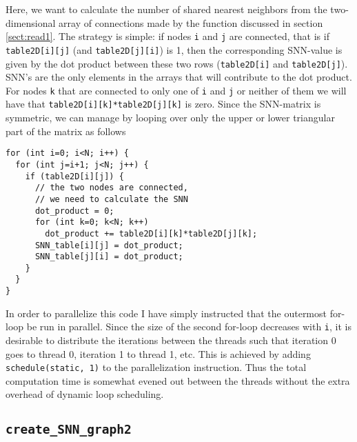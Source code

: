 \documentclass[reprint, english,notitlepage,nofootinbib]{revtex4-1}  %
\begin{document}
Here, we want to calculate the number of shared nearest neighbors from the two-dimensional array of connections made by the function discussed in section \ref{sect:read1}. The strategy is simple: if nodes \verb|i| and \verb|j| are connected, that is if \verb|table2D[i][j]| (and \verb|table2D[j][i]|) is 1, then the corresponding SNN-value is given by the dot product between these two rows (\verb|table2D[i]| and \verb|table2D[j]|). SNN's are the only elements in the arrays that will contribute to the dot product. For nodes \verb|k| that are connected to only one of \verb|i| and \verb|j| or neither of them we will have that \verb|table2D[i][k]*table2D[j][k]| is zero. Since the SNN-matrix is symmetric, we can manage by looping over only the upper or lower triangular part of the matrix as follows
\begin{verbatim}
for (int i=0; i<N; i++) {
  for (int j=i+1; j<N; j++) {
    if (table2D[i][j]) {
      // the two nodes are connected,
      // we need to calculate the SNN
      dot_product = 0;
      for (int k=0; k<N; k++)
        dot_product += table2D[i][k]*table2D[j][k];
      SNN_table[i][j] = dot_product;
      SNN_table[j][i] = dot_product;
    }
  }
}
\end{verbatim}

In order to parallelize this code I have simply instructed that the outermost for-loop be run in parallel. Since the size of the second for-loop decreases with \verb|i|, it is desirable to distribute the iterations between the threads such that iteration 0 goes to thread 0, iteration 1 to thread 1, etc. This is achieved by adding \verb|schedule(static, 1)| to the parallelization instruction. Thus the total computation time is somewhat evened out between the threads without the extra overhead of dynamic loop scheduling.


\subsection{\texttt{create\_SNN\_graph2}}
\end{document}
